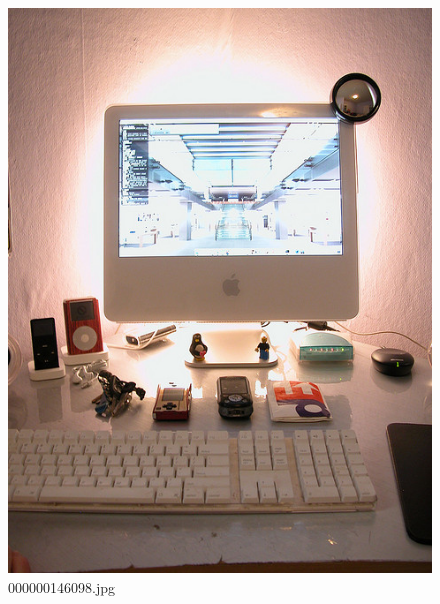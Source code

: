 \begin{figure}[h]
    \centering
    \includegraphics[width=0.8\linewidth]{../image set/hard/000000146098.jpg}
    \caption{000000146098.jpg}
\end{figure}
